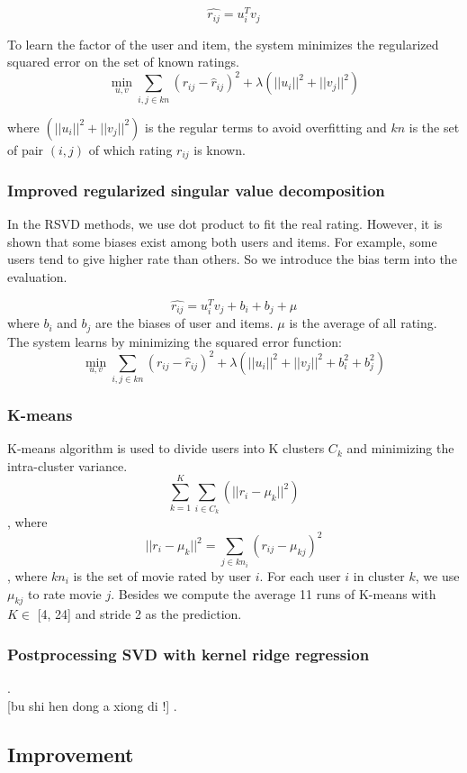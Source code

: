 \documentclass[10pt,conference,compsocconf]{IEEEtran}
\begin{document}
$$ \hat{r_{ij}}=u_{i}^{T}v_{j} $$

To learn the factor of the user and item, the system minimizes the regularized squared error on the set of known ratings.
$$  \min \limits_{u, v} \sum_{i, j\in kn} (r_{ij} - \hat r_{ij})^2 + \lambda (||u_i||^2 + ||v_j||^2)  $$

where $ (||u_i||^2 + ||v_j||^2)$ is the regular terms to avoid overfitting and $kn$ is the set of pair $(i, j)$ of which rating $r_{ij}$ is known.

\subsubsection{Improved regularized singular value decomposition}
In the RSVD methods, we use dot product to fit the real rating. However, it is shown that some biases exist among both users and items. For example, some users tend to give higher rate than others. So we introduce the bias term into the evaluation.

$$ \hat{r_{ij}}=u_{i}^{T}v_{j} + b_i + b_j  + \mu $$
where $b_i$ and $b_j$ are the biases of user and items. $\mu$ is the average of all rating. The system learns by minimizing the squared error function:
$$  \min \limits_{u, v} \sum_{i, j\in kn} (r_{ij} - \hat r_{ij})^2 + \lambda (||u_i||^2 + ||v_j||^2 + b_i^2 + b_j^2)  $$

\subsubsection{K-means}
 K-means algorithm is used to divide users into K clusters $C_k$ and minimizing the intra-cluster variance.
 $$   \sum_{k=1}^K \sum_{i \in C_k} (||r_{i}-\mu_k||^2)  $$, where $$  ||r_{i}-\mu_k||^2 = \sum_{j \in kn_i}(r_{ij}-\mu_{kj})^2  $$, where $kn_i$ is the set of movie rated by user $i$. 
 For each user $i$ in cluster $k$, we use $\mu_{kj}$ to rate movie $j$. Besides we compute the average 11 runs of K-means with $K\in$ [4, 24] and stride 2 as the prediction.

\subsubsection{Postprocessing SVD with kernel ridge regression}
.  \\

[bu shi hen dong a xiong di !]
. \\



\subsection{Improvement}
\end{document}
